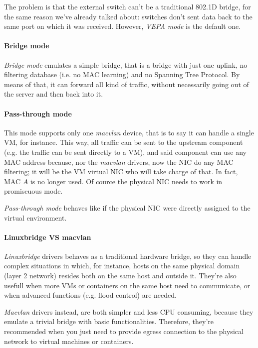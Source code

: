 \noindent
The problem is that the external switch can't be a traditional 802.1D bridge, for
the same reason we've already talked about: switches don't sent data back to
the same port on which it was received. However, \emph{VEPA mode} is the default
one.

\paragraph{Bridge mode}
\emph{Bridge mode} emulates a simple bridge, that is a bridge with just one
uplink, no filtering database (i.e. no MAC learning) and no Spanning Tree
Protocol. By means of that, it can forward all kind of traffic, without
necessarily going out of the server and then back into it.

\paragraph{Pass-through mode}
This mode supports only one \emph{macvlan} device, that is to say it can handle
a single VM, for instance. This way, all traffic can be sent to the upstream
component (e.g. the traffic can be sent directly to a VM), and said component
can use any MAC address because, nor the \emph{macvlan} drivers, now the NIC
do any MAC filtering; it will be the VM virtual NIC who will take charge of that.
In fact, MAC $A$ is no longer used. Of cource the physical NIC needs to work in
promiscuous mode.

\begin{note}
    \emph{Pass-through mode} behaves like if the physical NIC were directly
    assigned to the virtual environment.
\end{note}

\paragraph{Linuxbridge VS macvlan}
\emph{Linuxbridge} drivers behaves as a traditional hardware bridge, so they can
handle complex situations in which, for instance, hosts on the same physical
domain (layer 2 network) resides both on the same host and outside it. They're
also usefull when more VMs or containers on the same host need to communicate,
or when advanced functions (e.g. flood control) are needed.

\emph{Macvlan} drivers instead, are both simpler and less CPU consuming, because
they emulate a trivial bridge with basic functionalities. Therefore, they're
recommended when you just need to provide egress connection to the physical
network to virtual machines or containers.

